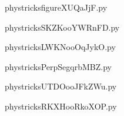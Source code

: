    \newcommand{\CaptionFigfigureXUQaJjF}{<+Type your caption here+>}
    \begin{center}
        
    \end{center}
    phystricksfigureXUQaJjF.py

    

    \clearpage
    


    \newcommand{\CaptionFigSKZKooYWRnFD}{<+Type your caption here+>}
    \begin{center}
        
    \end{center}
    phystricksSKZKooYWRnFD.py

    

    \clearpage
    


    \newcommand{\CaptionFigLWKNooOqJykO}{<+Type your caption here+>}
    \begin{center}
        
    \end{center}
    phystricksLWKNooOqJykO.py

    

    \clearpage
    


    \newcommand{\CaptionFigPerpSegqrbMBZ}{<+Type your caption here+>}
    \begin{center}
        
    \end{center}
    phystricksPerpSegqrbMBZ.py

    

    \clearpage
    


    \newcommand{\CaptionFigUTDOooJFkZWu}{<+Type your caption here+>}
    \begin{center}
        
    \end{center}
    phystricksUTDOooJFkZWu.py

    

    \clearpage
    


    \newcommand{\CaptionFigRKXHooRkoXOP}{<+Type your caption here+>}
    \begin{center}
        
    \end{center}
    phystricksRKXHooRkoXOP.py

